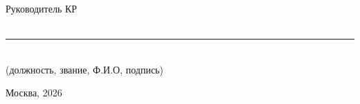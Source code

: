 \begin{titlepage}
\begin{singlespace}
\begin{flushright}
\begin{minipage}{0.55\textwidth}
{Руководитель КР\\[0.35cm]
\\[-0.05cm]
\rule{7.6cm}{0.4pt}\\[-0.05cm]
{\titlepagesmall (должность, звание, Ф.И.О, подпись)}
}
\end{minipage}
\end{flushright}

\vfill
{\titlepagefont Москва, 2026\par}

\end{singlespace}
\end{titlepage}
